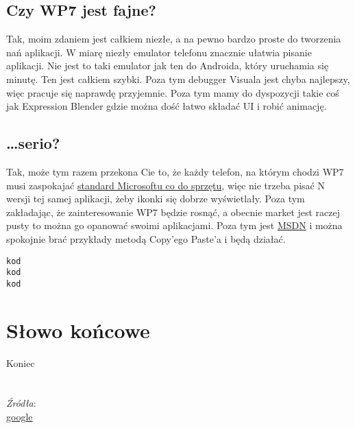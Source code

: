\documentclass[12pt, a4paper]{article}
\begin{document}
\subsection{Czy WP7 jest fajne?}
Tak, moim zdaniem jest całkiem niezłe, a na pewno bardzo proste do tworzenia nań
aplikacji. W miarę niezły emulator telefonu znacznie ułatwia pisanie aplikacji.
Nie jest to taki emulator jak ten do Androida, który uruchamia się minutę. Ten
jest całkiem szybki. Poza tym debugger Visuala jest chyba najlepszy, więc
pracuje się naprawdę przyjemnie. Poza tym mamy do dyspozycji takie coś jak
Expression Blender gdzie można dość łatwo składać UI i robić animację.
\subsection{\ldots serio?}
Tak, może tym razem przekona Cie to, że każdy telefon, na którym chodzi WP7 musi
zaspokajać
\href{http://msdn.microsoft.com/en-us/library/ff637514%28v=vs.92%29.aspx}{standard
 Microsoftu co do sprzętu}, więc nie trzeba pisać N wersji tej samej aplikacji,
 żeby ikonki się dobrze wyświetlały. Poza tym zakładając, że
zainteresowanie WP7 będzie rosnąć, a obecnie market jest raczej pusty to można
go opanować swoimi aplikacjami. Poza tym jest
\href{http://msdn.microsoft.com/en-us/library/ff402535%28v=vs.92%29}{MSDN} i
 można spokojnie brać przykłady metodą Copy'ego Paste'a i będą działać.


\begin{lstlisting}
kod
kod
kod
\end{lstlisting} 

\section{Słowo końcowe}
Koniec
\\\\\\
\emph{Źródła}:\\
\href{http://www.google.pl}{google}\\
\end{document}
